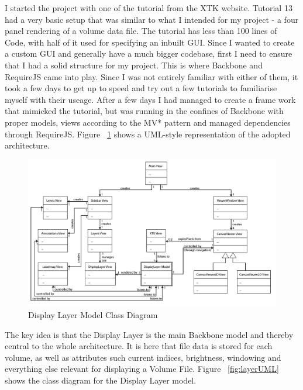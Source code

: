 \documentclass[a4paper,11pt,twoside]{article}
\begin{document}
I started the project with one of the tutorial from the XTK website. Tutorial 13 had a very basic setup that was similar to what I intended for my project - a four panel rendering of a volume data file. The tutorial has less than 100 lines of Code, with half of it used for specifying an inbuilt GUI. Since I wanted to create a custom GUI and generally have a much bigger codebase, first I need to ensure that I had a solid structure for my project. This is where Backbone and RequireJS came into play. Since I was not entirely familiar with either of them, it took a few days to get up to speed and try out a few tutorials to familiarise myself with their useage. After a few days I had managed to create a frame work that mimicked the tutorial, but was running in the confines of Backbone with proper models, views according to the MV* pattern and managed dependencies through RequireJS. Figure ~\ref{fig:generalUML} shows a UML-style representation of the adopted architecture. 

\begin{figure}[ht!]
\centering
\includegraphics[width=170mm]{graphics/generalUML_v01.png}
\caption{Display Layer Model Class Diagram}
\label{fig:generalUML}
\end{figure}

The key idea is that the Display Layer is the main Backbone model and thereby central to the whole architecture. It is here that file data is stored for each volume, as well as attributes such current indices, brightness, windowing and everything else relevant for displaying a Volume File. Figure ~\ref{fig:layerUML} shows the class diagram for the Display Layer model.
\end{document}

